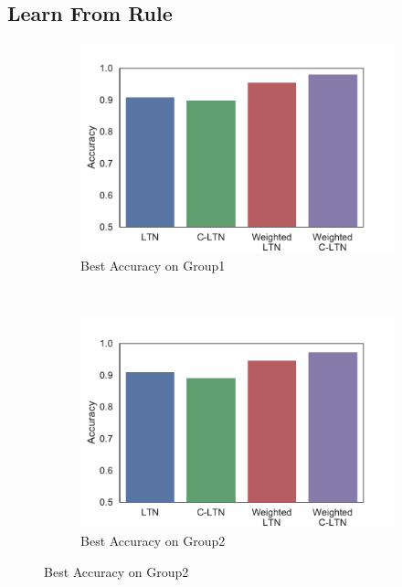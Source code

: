 
\subsection{Learn From Rule}

\begin{figure}[!]
    \centering
    \begin{subfigure}[]{0.24\textwidth}
        \includegraphics[width=\textwidth]{img/bar3.pdf}
        \caption{Best Accuracy on Group1}
        \label{fig:learning-best-accuracy-1}
    \end{subfigure}~~~~
    \begin{subfigure}[]{0.24\textwidth}
        \includegraphics[width=\textwidth]{img/bar4.pdf}
        \caption{Best Accuracy on Group2}
        \label{fig:learning-best-accuracy-2}
    \end{subfigure}


\end{figure}
